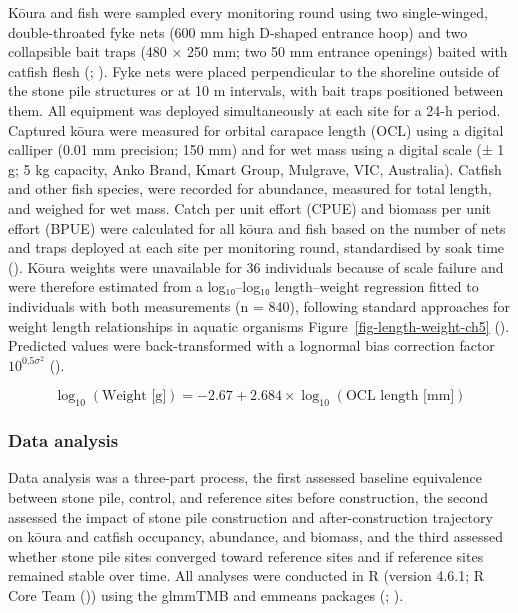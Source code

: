 \documentclass[
  letterpaper,
  DIV=11,
  numbers=noendperiod]{scrartcl}
\begin{document}
Kōura and fish were sampled every monitoring round using two
single-winged, double-throated fyke nets (600 mm high D-shaped entrance
hoop) and two collapsible bait traps (480 × 250 mm; two 50 mm entrance
openings) baited with catfish flesh (; ). Fyke nets were
placed perpendicular to the shoreline outside of the stone pile
structures or at 10 m intervals, with bait traps positioned between
them. All equipment was deployed simultaneously at each site for a 24-h
period. Captured kōura were measured for orbital carapace length (OCL)
using a digital calliper (0.01 mm precision; 150 mm) and for wet mass
using a digital scale (± 1 g; 5 kg capacity, Anko Brand, Kmart Group,
Mulgrave, VIC, Australia). Catfish and other fish species, were recorded
for abundance, measured for total length, and weighed for wet mass.
Catch per unit effort (CPUE) and biomass per unit effort (BPUE) were
calculated for all kōura and fish based on the number of nets and traps
deployed at each site per monitoring round, standardised by soak time
(). Kōura weights
were unavailable for 36 individuals because of scale failure and were
therefore estimated from a log₁₀--log₁₀ length--weight regression fitted
to individuals with both measurements (n = 840), following standard
approaches for weight length relationships in aquatic organisms
{Figure~\ref{fig-length-weight-ch5}} (). Predicted values were back-transformed with a lognormal bias
correction factor \(10^{0.5 \sigma^2}\) ().

\[
\log_{10}(\text{Weight [g]}) = -2.67 + 2.684 \times \log_{10}(\text{OCL length [mm]})
\]

\subsubsection{Data analysis}\label{data-analysis}

Data analysis was a three-part process, the first assessed baseline
equivalence between stone pile, control, and reference sites before
construction, the second assessed the impact of stone pile construction
and after-construction trajectory on kōura and catfish occupancy,
abundance, and biomass, and the third assessed whether stone pile sites
converged toward reference sites and if reference sites remained stable
over time. All analyses were conducted in R (version 4.6.1; R Core Team
()) using the glmmTMB and emmeans
packages (;
).
\end{document}
